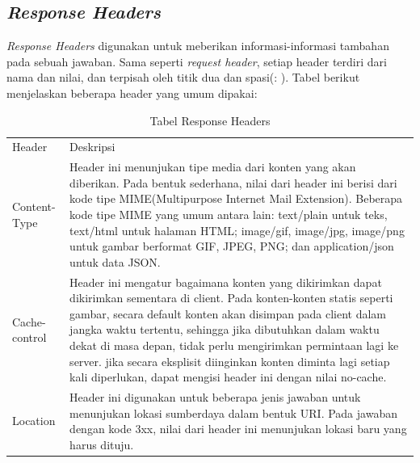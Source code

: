 \subsection{\textit{Response Headers}}
\label{subsec:responseheaders}

\textit{Response Headers} digunakan untuk meberikan informasi-informasi tambahan pada sebuah jawaban. Sama seperti \textit{request header}, setiap header terdiri dari nama dan nilai, dan terpisah oleh titik dua dan spasi(: ). Tabel berikut menjelaskan beberapa header yang umum dipakai:


\begin{table}[H]
\centering
\begin{tabular}{|p{3cm}|p{6cm}|}
Header        & Deskripsi                                                                                                                                                                                                                                                                                                                                                                                                                                                   \\
Content-Type  & Header ini menunjukan tipe media dari konten yang akan diberikan. Pada bentuk sederhana, nilai dari header ini berisi dari kode tipe MIME(Multipurpose Internet Mail Extension). Beberapa kode tipe MIME yang umum antara lain: text/plain untuk teks, text/html untuk halaman HTML; image/gif, image/jpg, image/png untuk gambar berformat GIF, JPEG, PNG; dan application/json untuk data JSON.                                                           \\
Cache-control & Header ini mengatur bagaimana konten yang dikirimkan dapat dikirimkan sementara di client. Pada konten-konten statis seperti gambar, secara default konten akan disimpan pada client dalam jangka waktu tertentu, sehingga jika dibutuhkan dalam waktu dekat di masa depan, tidak perlu mengirimkan permintaan lagi ke server. jika secara eksplisit diinginkan konten diminta lagi setiap kali diperlukan, dapat mengisi header ini dengan nilai no-cache. \\
Location      & Header ini digunakan untuk beberapa jenis jawaban untuk menunjukan lokasi sumberdaya dalam bentuk URI. Pada jawaban dengan kode 3xx, nilai dari header ini menunjukan lokasi baru yang harus dituju.                                                                                                                    
\caption[Tabel Response Headers]{Tabel Response Headers}
\label{table:responseheaders}
                                                                                                                           
\end{tabular}
\end{table}

